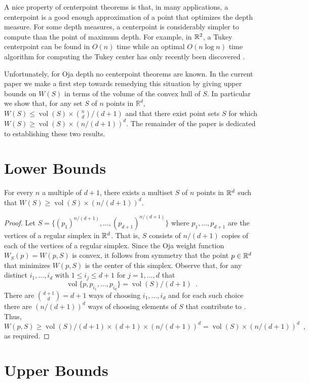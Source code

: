 \documentclass[lotsofwhite]{patmorin}
\DeclareMathOperator{\vol}{vol}
\begin{document}
A nice property of centerpoint theorems is that, in many applications,
a centerpoint is a good enough approximation of a point that optimizes
the depth measure.  For some depth measures, a centerpoint is
considerably simpler to compute than the point of maximum depth. For
example, in $\mathbb{R}^2$, a Tukey centerpoint can be found in $O(n)$ time
\cite{mxXX} while an optimal $O(n\log n)$ time algorithm for computing
the Tukey center has only recently been discovered \cite{c04}.

Unfortunately, for Oja depth no centerpoint theorems are known.  In
the current paper we make a first step towards remedying this
situation by giving upper bounds on $W(S)$ in terms of the volume of
the convex hull of $S$.  In particular we show that, for any set $S$
of $n$ points in $\mathbb{R}^d$, $W(S)\le \vol(S)\times {n\choose
d}/(d+1)$ and that there exist point sets $S$ for which $W(S)\ge
\vol(S)\times(n/(d+1))^d$.  The remainder of the paper is dedicated
to establishing these two results.

\section{Lower Bounds}

\begin{thm}
For every $n$ a multiple of $d+1$,
there exists a multiset $S$ of $n$ points in $\mathbb{R}^d$ such that
$W(S)\ge\vol(S)\times (n/(d+1))^d$.
\end{thm}

\begin{proof}
Let $S=\{(p_1)^{n/(d+1)},\ldots,(p_{d+1})^{n/(d+1)}\}$ where 
$p_1,\ldots,p_{d+1}$ are the vertices of a regular simplex
in $\mathbb{R}^d$.  That is, $S$ consists of $n/(d+1)$ copies of each of the
vertices of a regular simplex.
Since the Oja weight function $W_S(p)=W(p,S)$
is convex, it follows from symmetry that the point $p\in\mathbb{R}^d$ that
minimizes $W(p,S)$ is the center of this simplex.  Observe that, for
any distinct $i_1,\ldots,i_d$ with $1\le i_j\le d+1$ for
$j=1,\ldots,d$ that
\[
   \vol\{p,p_{i_1},\ldots,p_{i_d}\} = \vol(S)/(d+1) \enspace .
\]
There are ${d+1 \choose d}=d+1$ ways of choosing $i_1,\ldots,i_d$ and
for each such choice there are $(n/(d+1))^d$ ways of choosing elements
of $S$ that contribute to . Thus,
\[
    W(p,S) \ge \vol(S)/(d+1)\times (d+1)\times (n/(d+1))^d
     = \vol(S)\times (n/(d+1))^d \enspace ,
\]
as required. 
\end{proof}

\section{Upper Bounds}
\end{document}
